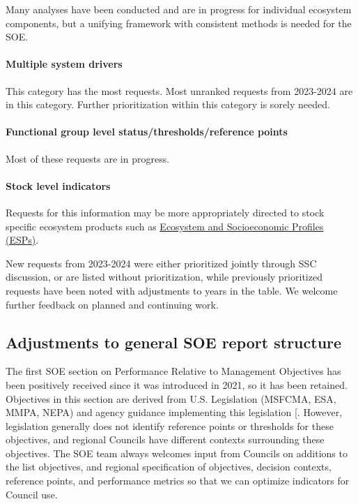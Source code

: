 \documentclass[
  10pt,
]{article}
\begin{document}
Many analyses have been conducted and are in progress for individual
ecosystem components, but a unifying framework with consistent methods
is needed for the SOE.

\paragraph{Multiple system drivers}\label{multiple-system-drivers}

This category has the most requests. Most unranked requests from
2023-2024 are in this category. Further prioritization within this
category is sorely needed.

\paragraph{Functional group level status/thresholds/reference
points}\label{functional-group-level-statusthresholdsreference-points}

Most of these requests are in progress.

\paragraph{Stock level indicators}\label{stock-level-indicators}

Requests for this information may be more appropriately directed to
stock specific ecosystem products such as
\href{https://www.fisheries.noaa.gov/new-england-mid-atlantic/science-data/ecosystem-and-socioeconomic-profiles-northeast-united-states}{Ecosystem
and Socioeconomic Profiles (ESPs)}.

New requests from 2023-2024 were either prioritized jointly through SSC
discussion, or are listed without prioritization, while previously
prioritized requests have been noted with adjustments to years in the
table. We welcome further feedback on planned and continuing work.

\subsection{Adjustments to general SOE report
structure}\label{adjustments-to-general-soe-report-structure}

The first SOE section on Performance Relative to Management Objectives
has been positively received since it was introduced in 2021, so it has
been retained. Objectives in this section are derived from U.S.
Legislation (MSFCMA, ESA, MMPA, NEPA) and agency guidance implementing
this legislation {[}\citeproc{ref-depiper_operationalizing_2017}{1}{]}.
However, legislation generally does not identify reference points or
thresholds for these objectives, and regional Councils have different
contexts surrounding these objectives. The SOE team always welcomes
input from Councils on additions to the list objectives, and regional
specification of objectives, decision contexts, reference points, and
performance metrics so that we can optimize indicators for Council use.
\end{document}
